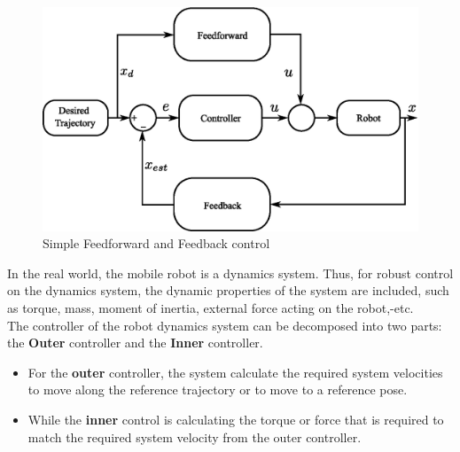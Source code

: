 \begin{figure}[ht]
	\centering
	\includegraphics[scale=1]{images/imagess/2lit-simplecontrl.eps} 
	\caption{Simple Feedforward and Feedback control}
	\label{fig:Simple Feedforward and Feedback control}
\end{figure}

\hspace{1.27cm}
In the real world, the mobile robot is a dynamics system. Thus, for robust control on the dynamics system, the dynamic properties of the system are included, such as torque, mass, moment of inertia, external force acting on the robot,-etc.\\
The controller of the robot dynamics system can be decomposed into two parts: the \textbf{Outer} controller and the \textbf{Inner} controller.
\begin{itemize}
    \item For the \textbf{outer} controller, the system calculate the required system velocities to move along the reference trajectory or to move to a reference pose. 
    \item While the \textbf{inner} control is calculating the torque or force that is required to match the required system velocity from the outer controller.
\end{itemize}
\par














